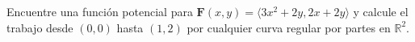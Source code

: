 Encuentre una función potencial para $\mathbf{F}(x,y)=\langle3x^2+2y,2x+2y\rangle$ y calcule el trabajo desde $(0,0)$ hasta $(1,2)$ por cualquier curva regular por partes en $\mathbb R^2$.
